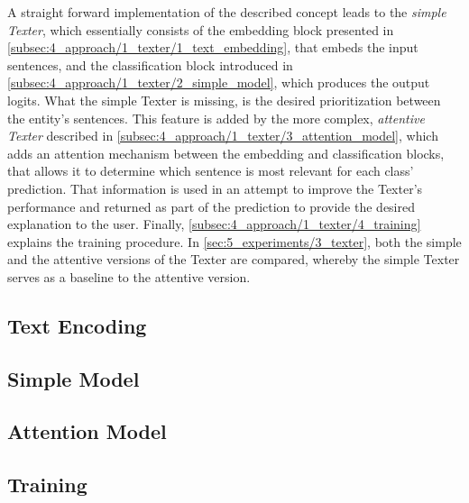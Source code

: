 A straight forward implementation of the described concept leads to the \emph{simple Texter}, which essentially consists of the embedding block presented in \autoref{subsec:4_approach/1_texter/1_text_embedding}, that embeds the input sentences, and the classification block introduced in \autoref{subsec:4_approach/1_texter/2_simple_model}, which produces the output logits. What the simple Texter is missing, is the desired prioritization between the entity's sentences. This feature is added by the more complex, \emph{attentive Texter} described in \autoref{subsec:4_approach/1_texter/3_attention_model}, which adds an attention mechanism between the embedding and classification blocks, that allows it to determine which sentence is most relevant for each class' prediction. That information is used in an attempt to improve the Texter's performance and returned as part of the prediction to provide the desired explanation to the user. Finally, \autoref{subsec:4_approach/1_texter/4_training} explains the training procedure. In \autoref{sec:5_experiments/3_texter}, both the simple and the attentive versions of the Texter are compared, whereby the simple Texter serves as a baseline to the attentive version.

\subsection{Text Encoding}
\label{subsec:4_approach/1_texter/1_text_embedding}


\subsection{Simple Model}
\label{subsec:4_approach/1_texter/2_simple_model}


\subsection{Attention Model}
\label{subsec:4_approach/1_texter/3_attention_model}


\subsection{Training}
\label{subsec:4_approach/1_texter/4_training}


